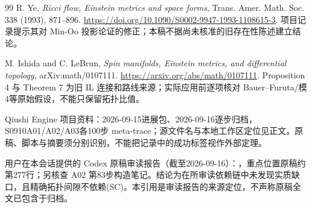 \documentclass[UTF8,a4paper,11pt,fontset=fandol]{ctexart}
\numberwithin{equation}{section}
\theoremstyle{definition}
\begin{document}
\begin{thebibliography}{99}
 R. Ye, \emph{Ricci flow, Einstein metrics and space forms}, Trans. Amer. Math. Soc. 338 (1993), 871--896. \url{https://doi.org/10.1090/S0002-9947-1993-1108615-3}. 项目记录提示其对 Min-Oo 投影论证的修正；本稿不据尚未核准的旧存在性陈述建立结论。

 M. Ishida and C. LeBrun, \emph{Spin manifolds, Einstein metrics, and differential topology}, arXiv:math/0107111. \url{https://arxiv.org/abs/math/0107111}. Proposition 4 与 Theorem 7 为旧 IL 连接和路线来源；实际应用前逐项核对 Bauer--Furuta/模4等原始假设，不能只保留拓扑比值。

 Qiushi Engine 项目资料：2026-09-15进展包、2026-09-16逐步归档，S0910A01/A02/A03各100步 meta-trace；源文件名与本地工作区定位见正文。原稿、脚本与摘要须分别识别，不能把记录中的成功标签视作外部定理。

 用户在本会话提供的 Codex 原稿审读报告（截至2026-09-16）：，重点位置原稿约第277行；另核查 A02 第83步构造笔记。结论为在所审读依赖链中未发现实质缺口，且精确拓扑间隙不依赖(SC)。本引用是审读报告的来源定位，不声称原稿全文已包含于归档。

\end{thebibliography}
\end{document}
